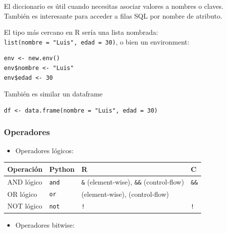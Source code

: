 \documentclass[
]{book}
\newcounter{none} %
\providecommand{\tightlist}{%
  \setlength{\itemsep}{0pt}\setlength{\parskip}{0pt}}
\theoremstyle{break}
\theoremstyle{nonumberplain}
\begin{document}
El diccionario es útil cuando necesitas asociar valores a nombres o claves.
También es interesante para acceder a filas SQL por nombre de atributo.

El tipo más cercano en R sería una lista nombrada: \texttt{list(nombre\ =\ "Luis",\ edad\ =\ 30)},
o bien un environment:

\begin{verbatim}
env <- new.env()
env$nombre <- "Luis"
env$edad <- 30
\end{verbatim}

También es similar un dataframe

\begin{verbatim}
df <- data.frame(nombre = "Luis", edad = 30)
\end{verbatim}

\subsubsection{Operadores}\label{operadores}

\begin{itemize}
\tightlist
\item
  Operadores lógicos:
\end{itemize}

{\def\LTcaptype{none} %
\begin{longtable}[]{@{}llll@{}}
\toprule\noalign{}
Operación & Python & R & C \\
\midrule\noalign{}
\endhead
\bottomrule\noalign{}
\endlastfoot
AND lógico & \texttt{and} & \texttt{\&} (element-wise), \texttt{\&\&} (control-flow) & \texttt{\&\&} \\
OR lógico & \texttt{or} & \texttt{\textbar{}} (element-wise), \texttt{\textbar{}\textbar{}} (control-flow) & \texttt{\textbar{}\textbar{}} \\
NOT lógico & \texttt{not} & \texttt{!} & \texttt{!} \\
\end{longtable}
}

\begin{itemize}
\tightlist
\item
  Operadores bitwise:
\end{itemize}
\end{document}
